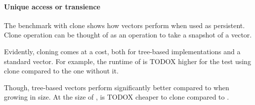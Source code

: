 \paragraph{Unique access or transience}
The benchmark with clone shows how vectors perform when used as persistent. Clone operation can be thought of as an operation to take a snapshot of a vector. 

Evidently, cloning comes at a cost, both for tree-based implementations and a standard vector. For example, the runtime of \rbvec{} is TODOX higher for the test using clone compared to the one without it. 

Though, tree-based vectors perform significantly better compared to \stdvec{} when growing in size. At the size of , \rbvec{} is TODOX cheaper to clone compared to \stdvec{}. 

